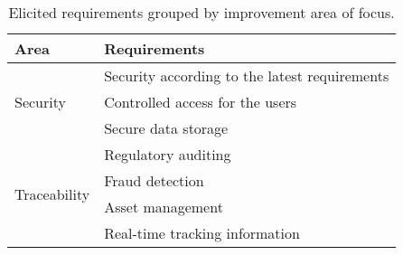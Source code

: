 \begin{table}[]
    \centering
    \caption{Elicited requirements grouped by improvement area of focus.}
    \label{table:elicited-requirements-survey}
    \begin{tabular}{|l|l|}
    \hline
    \textbf{Area}                                                                                              & \textbf{Requirements}                                                                                                              \\ \hline
    \multirow{3}{*}{Security}                                                                                  & Security according to the latest requirements                                                                                      \\ \cline{2-2} 
                                                                                                               & Controlled access for the users                                                                                                    \\ \cline{2-2} 
                                                                                                               & Secure data storage                                                                                                                \\ \hline
    \multirow{4}{*}{Traceability}                                                                              & Regulatory auditing                                                                                                                \\ \cline{2-2} 
                                                                                                               & Fraud detection                                                                                                                    \\ \cline{2-2} 
                                                                                                               & Asset management                                                                                                                   \\ \cline{2-2} 
                                                                                                               & Real-time tracking information                                                                                                     \\ \hline

\end{tabular}
\end{table}
